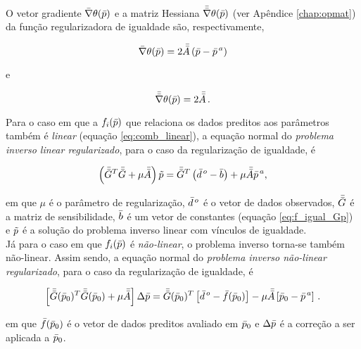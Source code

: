 \indent O vetor gradiente $\bar{\nabla}\theta(\bar{p})$ e a matriz Hessiana
$\bar{\bar{\nabla}}\theta(\bar{p})$ (ver Apêndice \ref{chap:opmat}) da função
regularizadora de igualdade são, respectivamente,

\begin{equation}
\bar{\nabla}\theta(\bar{p}) = 2\bar{\bar{A}}
    \left(\bar{p} - \bar{p}^{\thinspace a} \right)
\end{equation}

\noindent e

\begin{equation}
\bar{\bar{\nabla}}\theta(\bar{p}) = 2\bar{\bar{A}} \thinspace .
\end{equation}

\indent Para o caso em que a $f_i(\bar{p})$ que relaciona
os dados preditos aos parâmetros também é {\it linear} (equação \ref{eq:comb_linear}),
a equação normal do {\it problema inverso linear regularizado},
para o caso da regularização de igualdade, é

\begin{equation}
\left(\bar{\bar{G}}^T\bar{\bar{G}} + \mu\bar{\bar{A}}\right)\tilde{p} =
    \bar{\bar{G}}^T\left(\bar{d}^{\thinspace o} - \bar{b} \right) +
    \mu\bar{\bar{A}}\bar{p}^{\thinspace a} ,
\end{equation}

\noindent em que $\mu$ é o parâmetro de regularização, $\bar{d}^{\thinspace o}$
é o vetor de dados observados, $\bar{\bar{G}}$ é a matriz de sensibilidade, $\bar{b}$
é um vetor de constantes (equação \ref{eq:f_igual_Gp}) e $\tilde{p}$ é a solução
do problema inverso linear com vínculos de igualdade.
\\
\indent Já para o caso em que $f_i(\bar{p})$ é {\it não-linear}, o problema
inverso torna-se também não-linear. Assim sendo, a equação normal do
{\it problema inverso não-linear regularizado}, para o caso da regularização de
igualdade, é

\begin{equation}
\left[\bar{\bar{G}}(\bar{p}_0)^T\bar{\bar{G}}(\bar{p}_0) +
      \mu\bar{\bar{A}}\right]\Delta\bar{p} =
\bar{\bar{G}}(\bar{p}_0)^T \left[\bar{d}^{\thinspace o} - \bar{f}(\bar{p}_0)\right] -
\mu\bar{\bar{A}}\left[\bar{p}_0 - \bar{p}^{\thinspace a}\right]
    \thinspace .
\end{equation}

\noindent em que $\bar{f}(\bar{p}_0)$ é o vetor de dados preditos avaliado em
$\bar{p}_0$ e $\Delta\bar{p}$ é a correção a ser aplicada a $\bar{p}_0$.

